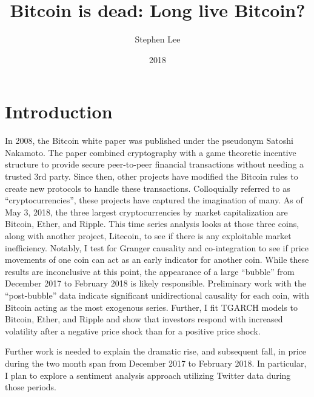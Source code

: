 \documentclass{article}
\author{Stephen Lee}
\title{Bitcoin is dead: Long live Bitcoin?}
\date{2018}
\begin{document}
	\maketitle
	
	\section{Introduction}
	In 2008, the Bitcoin white paper was published under the pseudonym Satoshi Nakamoto. The paper combined cryptography with a game theoretic incentive structure to provide secure peer-to-peer financial transactions without needing a trusted 3rd party.  Since then, other projects have modified the Bitcoin rules to create new protocols to handle these transactions. Colloquially referred to as ``cryptocurrencies'', these projects have captured the imagination of many. As of May 3, 2018, the three largest cryptocurrencies by market capitalization are Bitcoin, Ether, and Ripple. This time series analysis looks at those three coins, along with another project, Litecoin, to see if there is any exploitable market inefficiency. Notably, I test for Granger causality and co-integration to see if price movements of one coin can act as an early indicator for another coin. While these results are inconclusive at this point, the appearance of a large ``bubble'' from December 2017 to February 2018 is likely responsible. Preliminary work with the ``post-bubble'' data indicate significant unidirectional causality for each coin, with Bitcoin acting as the most exogenous series. Further, I fit TGARCH models to Bitcoin, Ether, and Ripple and show that investors respond with increased volatility after a negative price shock than for a positive price shock. 
	
	Further work is needed to explain the dramatic rise, and subsequent fall, in price during the two month span from December 2017 to February 2018. In particular, I plan to explore a sentiment analysis approach utilizing Twitter data during those periods. 
	
\end{document}
